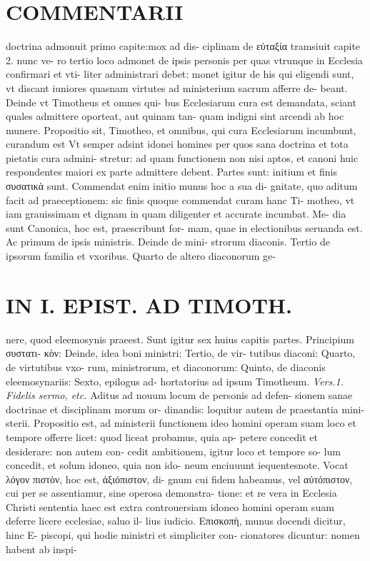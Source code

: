 \documentclass{article}
\begin{document}
\begin{pages}
\section*{COMMENTARII }
\marginpar{[ p.60 ]}\pstart doctrina admonuit primo capite:mox ad dis- ciplinam de εὐταξία tramsiuit capite 2. nunc ve- ro tertio loco admonet de ipsis personis per quas vtrunque in Ecclesia confirmari et vti- liter administrari debet: monet igitur de his qui eligendi sunt, vt discant iuniores quasnam virtutes ad ministerium sacrum afferre de- beant. Deinde vt Timotheus et omnes qui- bus Ecclesiarum cura est demandata, sciant quales admittere oporteat, aut quinam tan- quam indigni sint arcendi ab hoc munere.  \pend\pstart Propositio sit, Timotheo, et omnibus, qui cura Ecclesiarum incumbunt, curandum est Vt semper adsint idonei homines per quos sana doctrina et tota pietatis cura admini- stretur: ad quam functionem non nisi aptos, et canoni huic respondentes maiori ex parte admittere debent.  \pend\pstart Partes sunt: initium et finis συσατικὰ sunt. Commendat enim initio munus hoc a sua di- gnitate, quo aditum facit ad praeceptionem: sic finis quoque commendat curam hanc Ti- motheo, vt iam grauissimam et dignam in quam diligenter et accurate incumbat. Me- dia sunt Canonica, hoc est, praescribunt for- mam, quae in electionibus seruanda est. Ac primum de ipsis ministris. Deinde de mini- strorum diaconis. Tertio de ipsorum familia et vxoribus. Quarto de altero diaconorum ge-  \pend
\section*{IN I. EPIST. AD TIMOTH. }
\marginpar{[ p.61 ]}\pstart nere, quod eleemosynis praeest. Sunt igitur sex huius capitis partes. Principium συστατι- κὸν: Deinde, idea boni ministri: Tertio, de vir- tutibus diaconi: Quarto, de virtutibus vxo- rum, ministrorum, et diaconorum: Quinto, de diaconis eleemosynariis: Sexto, epilogus ad- hortatorius ad ipsum Timotheum.  \pend
\textit{Vers.1. Fidelis sermo, etc. }\pstart Aditus ad nouum locum de personis ad defen- sionem sanae doctrinae et disciplinam morum or- dinandis: loquitur autem de praestantia mini- sterii. Propositio est, ad ministerii functionem ideo homini operam suam loco et tempore offerre licet: quod liceat probamus, quia ap- petere concedit et desiderare: non autem con- cedit ambitionem, igitur loco et tempore so- lum concedit, et solum idoneo, quia non ido- neum enciuuunt iequentesnote.  \pend\pstart Vocat λόγον πιστὸν, hoc est, ἀξιόπιστον, di- gnum cui fidem habeamus, vel αὐτόπιστον, cui per se assentiamur, sine operosa demonstra- tione: et re vera in Ecclesia Christi sententia haec est extra controuersiam idoneo homini operam suam deferre licere ecclesiae, saluo il- lius iudicio.  \pend\pstart Επισκοπὴ, munus docendi dicitur, hinc E- piscopi, qui hodie ministri et simpliciter con- cionatores dicuntur: nomen habent ab inspi-  \pend

\end{pages}
\end{document}
